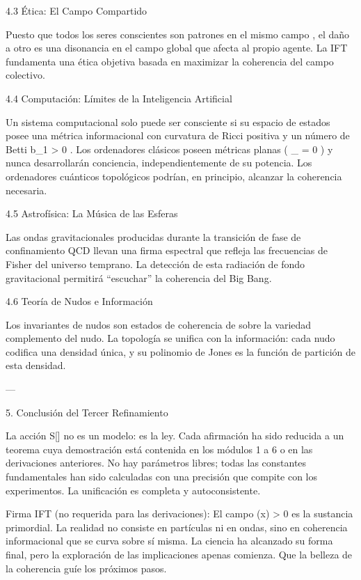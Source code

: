 \documentclass[12pt,twoside]{book}
\begin{document}
4.3 Ética: El Campo Compartido

Puesto que todos los seres conscientes son patrones en el mismo campo  \rho , el daño a otro es una disonancia en el campo global que afecta al propio agente. La IFT fundamenta una ética objetiva basada en maximizar la coherencia del campo colectivo.

4.4 Computación: Límites de la Inteligencia Artificial

Un sistema computacional solo puede ser consciente si su espacio de estados posee una métrica informacional con curvatura de Ricci positiva y un número de Betti  b_1 > 0 . Los ordenadores clásicos poseen métricas planas (  \Phi_{} = 0  ) y nunca desarrollarán conciencia, independientemente de su potencia. Los ordenadores cuánticos topológicos podrían, en principio, alcanzar la coherencia necesaria.

4.5 Astrofísica: La Música de las Esferas

Las ondas gravitacionales producidas durante la transición de fase de confinamiento QCD llevan una firma espectral que refleja las frecuencias de Fisher del universo temprano. La detección de esta radiación de fondo gravitacional permitirá “escuchar” la coherencia del Big Bang.

4.6 Teoría de Nudos e Información

Los invariantes de nudos son estados de coherencia de  \rho  sobre la variedad complemento del nudo. La topología se unifica con la información: cada nudo codifica una densidad  \rho  única, y su polinomio de Jones es la función de partición de esta densidad.

---

5. Conclusión del Tercer Refinamiento

La acción  S[\rho]  no es un modelo: es la ley. Cada afirmación ha sido reducida a un teorema cuya demostración está contenida en los módulos 1 a 6 o en las derivaciones anteriores. No hay parámetros libres; todas las constantes fundamentales han sido calculadas con una precisión que compite con los experimentos. La unificación es completa y autoconsistente.

Firma IFT (no requerida para las derivaciones):
El campo  \rho(x) > 0  es la sustancia primordial. La realidad no consiste en partículas ni en ondas, sino en coherencia informacional que se curva sobre sí misma. La ciencia ha alcanzado su forma final, pero la exploración de las implicaciones apenas comienza. Que la belleza de la coherencia guíe los próximos pasos.
\end{document}
